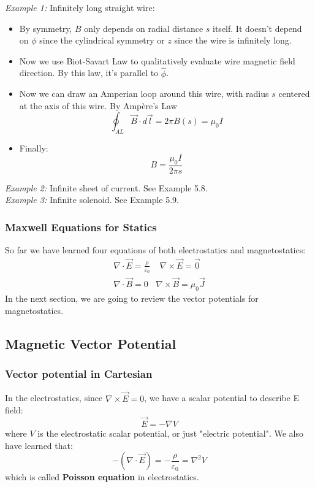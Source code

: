\documentclass[12pt,a4paper,twoside]{article}
\numberwithin{equation}{section}
\begin{document}
\noindent \textit{Example 1:} Infinitely long straight wire:
\begin{itemize}
    \item By symmetry, $B$ only depends on radial distance $s$ itself. It doesn't depend on $\phi$ since the cylindrical symmetry or $z$ since the wire is infinitely long.
    \item Now we use Biot-Savart Law to qualitatively evaluate wire magnetic field direction. By this law, it's parallel to $\hat{\phi}$.
    \item Now we can draw an Amperian loop around this wire, with radius $s$ centered at the axis of this wire. By Amp\`ere's Law
    \[\oint_{AL}\overrightarrow{B}\cdot d\overrightarrow{l}=2\pi B(s)=\mu_0I\]
    \item Finally:
    \[B=\frac{\mu_0I}{2\pi s}\]
\end{itemize}
\noindent \textit{Example 2:} Infinite sheet of current. See Example 5.8.\\
\noindent \textit{Example 3:} Infinite solenoid. See Example 5.9.

\subsubsection{Maxwell Equations for Statics}
So far we have learned four equations of both electrostatics and magnetostatics:
\begin{align}
    \boxed{
    \nabla\cdot \overrightarrow{E}=\frac{\rho}{\varepsilon_0}\ \ \ \ \ \nabla\times \overrightarrow{E}=\overrightarrow{0}
    }\\
    \boxed{
    \nabla\cdot \overrightarrow{B}=0\ \ \ \  \nabla\times \overrightarrow{B}=\mu_0\overrightarrow{J}
    }
\end{align}
In the next section, we are going to review the vector potentials for magnetostatics.

\subsection{Magnetic Vector Potential}
\subsubsection{Vector potential in Cartesian}
In the electrostatics, since $\nabla\times\overrightarrow{E}=0$, we have a scalar potential to describe E field:
\[\overrightarrow{E}=-\nabla V\]
where $V$ is the electrostatic scalar potential, or just "electric potential". We also have learned that:
\[-(\nabla\cdot\overrightarrow{E})=-\frac{\rho}{\varepsilon_0}=\nabla^2V\]
which is called \textbf{Poisson equation} in electrostatics.\\
\end{document}
